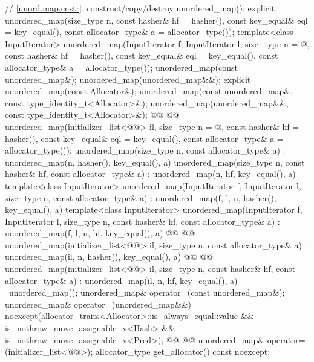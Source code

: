 \documentclass{wg21}
\begin{document}
\begin{codeblock}
{{        // \ref{unord.map.cnstr}, construct/copy/destroy
        unordered_map();
        explicit unordered_map(size_type n,
        const hasher& hf = hasher(),
        const key_equal& eql = key_equal(),
        const allocator_type& a = allocator_type());
        template<class InputIterator>
        unordered_map(InputIterator f, InputIterator l,
        size_type n = @\seebelow@,
        const hasher& hf = hasher(),
        const key_equal& eql = key_equal(),
        const allocator_type& a = allocator_type());
        unordered_map(const unordered_map&);
        unordered_map(unordered_map&&);
        explicit unordered_map(const Allocator&);
        unordered_map(const unordered_map&, const type_identity_t<Allocator>&);
        unordered_map(unordered_map&&, const type_identity_t<Allocator>&);
        @@
        @@
        unordered_map(initializer_list<@@> il,
        size_type n = @\seebelow@,
        const hasher& hf = hasher(),
        const key_equal& eql = key_equal(),
        const allocator_type& a = allocator_type());
        unordered_map(size_type n, const allocator_type& a)
        : unordered_map(n, hasher(), key_equal(), a) { }
        unordered_map(size_type n, const hasher& hf, const allocator_type& a)
        : unordered_map(n, hf, key_equal(), a) { }
        template<class InputIterator>
        unordered_map(InputIterator f, InputIterator l, size_type n, const allocator_type& a)
        : unordered_map(f, l, n, hasher(), key_equal(), a) { }
        template<class InputIterator>
        unordered_map(InputIterator f, InputIterator l, size_type n, const hasher& hf,
        const allocator_type& a)
        : unordered_map(f, l, n, hf, key_equal(), a) { }
        @@
        @@
        unordered_map(initializer_list<@@> il, size_type n, const allocator_type& a)
        : unordered_map(il, n, hasher(), key_equal(), a) { }
        @@
        @@
        unordered_map(initializer_list<@@> il, size_type n, const hasher& hf,
        const allocator_type& a)
        : unordered_map(il, n, hf, key_equal(), a) { }
        ~unordered_map();
        unordered_map& operator=(const unordered_map&);
        unordered_map& operator=(unordered_map&&)
        noexcept(allocator_traits<Allocator>::is_always_equal::value &&
        is_nothrow_move_assignable_v<Hash> &&
        is_nothrow_move_assignable_v<Pred>);
        @@
        @@
        unordered_map& operator=(initializer_list<@@>);
        allocator_type get_allocator() const noexcept;
        
}}
\end{codeblock}
\end{document}
